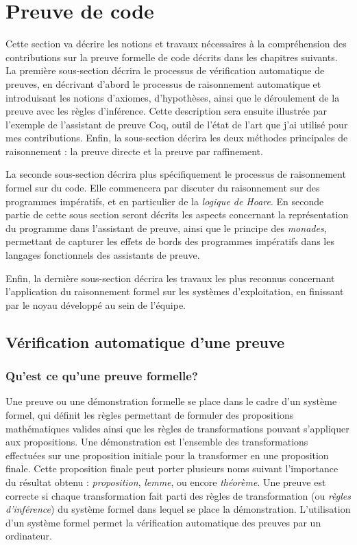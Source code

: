 	\section{Preuve de code}

	Cette section va décrire les notions et travaux nécessaires à la compréhension des contributions sur la preuve formelle de code décrits dans les chapitres suivants. La première sous-section décrira le processus de vérification automatique de preuves, en décrivant d'abord le processus de raisonnement automatique et introduisant les notions d'axiomes, d'hypothèses, ainsi que le déroulement de la preuve avec les règles d'inférence. Cette description sera ensuite illustrée par l'exemple de l'assistant de preuve Coq, outil de l'état de l'art que j'ai utilisé pour mes contributions. Enfin, la sous-section décrira les deux méthodes principales de raisonnement : la preuve directe et la preuve par raffinement.

	La seconde sous-section décrira plus spécifiquement le processus de raisonnement formel sur du code. Elle commencera par discuter du raisonnement sur des programmes impératifs, et en particulier de la \emph{logique de Hoare}. En seconde partie de cette sous section seront décrits les aspects concernant la représentation du programme dans l'assistant de preuve, ainsi que le principe des \emph{monades}, permettant de capturer les effets de bords des programmes impératifs dans les langages fonctionnels des assistants de preuve.

	Enfin, la dernière sous-section décrira les travaux les plus reconnus concernant l'application du raisonnement formel sur les systèmes d'exploitation, en finissant par le noyau développé au sein de l'équipe.

		\subsection{Vérification automatique d'une preuve}

			\subsubsection{Qu'est ce qu'une preuve formelle?}
			Une preuve ou une démonstration formelle se place dans le cadre d'un système formel, qui définit les règles permettant de formuler des propositions mathématiques valides ainsi que les règles de transformations pouvant s'appliquer aux propositions. Une démonstration est l'ensemble des transformations effectuées sur une proposition initiale pour la transformer en une proposition finale. Cette proposition finale peut porter plusieurs noms suivant l'importance du résultat obtenu : \emph{proposition}, \emph{lemme}, ou encore \emph{théorème}. Une preuve est correcte si chaque transformation fait parti des règles de transformation (ou \emph{règles d'inférence}) du système formel dans lequel se place la démonstration. L'utilisation d'un système formel permet la vérification automatique des preuves par un ordinateur.

